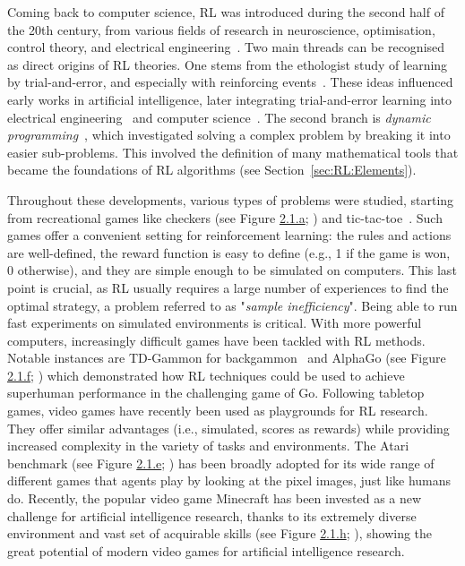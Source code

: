 Coming back to computer science, RL was introduced during the second half of the 20th century, from various fields of research in neuroscience, optimisation, control theory, and electrical engineering~\citep{Sutton2018_RL}. Two main threads can be recognised as direct origins of RL theories. One stems from the ethologist study of learning by trial-and-error, and especially with reinforcing events~\citep{Thorndike1911_AnimalIntell, Rescorla1972_Pavlovian}. These ideas influenced early works in artificial intelligence, later integrating trial-and-error learning into electrical engineering~\citep{Walter1950_MechTortoise} and computer science~\citep{Minsky1961}. The second branch is \textit{dynamic programming}~\citep{Bellman1966_DP}, which investigated solving a complex problem by breaking it into easier sub-problems. This involved the definition of many mathematical tools that became the foundations of RL algorithms (see Section~\ref{sec:RL:Elements}).

Throughout these developments, various types of problems were studied, starting from recreational games like checkers (see Figure \hyperref[fig:rl-envs]{2.1.a}; \cite{Samuel1959_Checkers}) and tic-tac-toe~\citep{Michie1968_Boxes}. Such games offer a convenient setting for reinforcement learning: the rules and actions are well-defined, the reward function is easy to define (e.g., 1 if the game is won, 0 otherwise), and they are simple enough to be simulated on computers. This last point is crucial, as RL usually requires a large number of experiences to find the optimal strategy, a problem referred to as "\textit{sample inefficiency}". Being able to run fast experiments on simulated environments is critical. With more powerful computers, increasingly difficult games have been tackled with RL methods. Notable instances are TD-Gammon for backgammon~\citep{Tesauro1994_TDGammon} and AlphaGo (see Figure \hyperref[fig:rl-envs]{2.1.f}; \cite{Silver2016_AlphaGo}) which demonstrated how RL techniques could be used to achieve superhuman performance in the challenging game of Go. Following tabletop games, video games have recently been used as playgrounds for RL research. They offer similar advantages (i.e., simulated, scores as rewards) while providing increased complexity in the variety of tasks and environments. The Atari benchmark (see Figure \hyperref[fig:rl-envs]{2.1.e}; \cite{Bellemare2013_Atari}) has been broadly adopted for its wide range of different games that agents play by looking at the pixel images, just like humans do. Recently, the popular video game Minecraft has been invested as a new challenge for artificial intelligence research, thanks to its extremely diverse environment and vast set of acquirable skills (see Figure \hyperref[fig:rl-envs]{2.1.h}; \cite{Oh2016_Minecraft,Guss2019_MineRL}), showing the great potential of modern video games for artificial intelligence research. 

